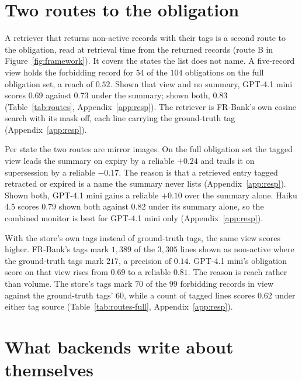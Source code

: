 \documentclass{article}
\begin{document}
\section{Two routes to the obligation}\label{sec:routes}

A retriever that returns non-active records with their tags is a second route to the obligation, read at retrieval time from the returned records (route B in Figure~\ref{fig:framework}).
It covers the states the list does not name.
A five-record view holds the forbidding record for $54$ of the $104$ obligations on the full obligation set, a reach of $0.52$.
Shown that view and no summary, GPT-4.1 mini scores $0.69$ against $0.73$ under the summary; shown both, $0.83$ (Table~\ref{tab:routes}, Appendix~\ref{app:resp}).
The retriever is FR-Bank's own cosine search with its mask off, each line carrying the ground-truth tag (Appendix~\ref{app:resp}).


Per state the two routes are mirror images.
On the full obligation set the tagged view leads the summary on expiry by a reliable $+0.24$ and trails it on supersession by a reliable $-0.17$.
The reason is that a retrieved entry tagged retracted or expired is a name the summary never lists (Appendix~\ref{app:resp}).
Shown both, GPT-4.1 mini gains a reliable $+0.10$ over the summary alone.
Haiku 4.5 scores $0.79$ shown both against $0.82$ under its summary alone, so the combined monitor is best for GPT-4.1 mini only (Appendix~\ref{app:resp}).

With the store's own tags instead of ground-truth tags, the same view scores higher.
FR-Bank's tags mark $1{,}389$ of the $3{,}305$ lines shown as non-active where the ground-truth tags mark $217$, a precision of $0.14$.
GPT-4.1 mini's obligation score on that view rises from $0.69$ to a reliable $0.81$.
The reason is reach rather than volume.
The store's tags mark $70$ of the $99$ forbidding records in view against the ground-truth tags' $60$, while a count of tagged lines scores $0.62$ under either tag source (Table~\ref{tab:routes-full}, Appendix~\ref{app:resp}).


\section{What backends write about themselves}\label{sec:backends}\label{sec:inversion}\label{sec:stores}
\end{document}
